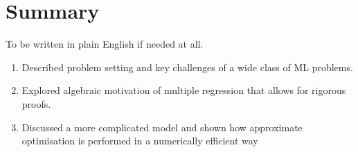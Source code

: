 \documentclass[a4paper]{article}
\theoremstyle{break}
\begin{document}
\section{Summary}
To be written in plain English if needed at all.
\begin{enumerate}
    \item Described problem setting and key challenges of a wide class of ML problems.
    \item Explored algebraic motivation of multiple regression that allows for rigorous proofs.
    \item Discussed a more complicated model and shown how approximate optimisation is performed in a numerically efficient way
\end{enumerate}

% 
% 
\end{document}
